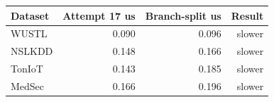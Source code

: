\begin{tabular}{lrrr}
\toprule
Dataset & Attempt 17 us & Branch-split us & Result \\
\midrule
WUSTL & 0.090 & 0.096 & slower \\
NSLKDD & 0.148 & 0.166 & slower \\
TonIoT & 0.143 & 0.185 & slower \\
MedSec & 0.166 & 0.196 & slower \\
\bottomrule
\end{tabular}
